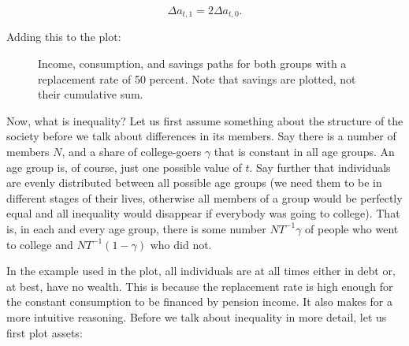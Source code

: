 \documentclass[a4paper, 12pt]{article}
\begin{document}
\[
    \Delta a_{t,1} = 2\Delta a_{t,0}.
\]

Adding this to the plot:

\begin{figure}[H]
    \centering
    \caption{Income, consumption, and savings paths for both groups with a replacement rate of 50 percent. Note that savings are plotted, not their cumulative sum.}
    \label{fig:graph3a_3}
\end{figure}

Now, what is inequality? Let us first assume something about the structure of the society before we talk about differences in its members. Say there is a number of members $N$, and a share of college-goers $\gamma$ that is constant in all age groups. An age group is, of course, just one possible value of $t$. Say further that individuals are evenly distributed between all possible age groups (we need them to be in different stages of their lives, otherwise all members of a group would be perfectly equal and all inequality would disappear if everybody was going to college). That is, in each and every age group, there is some number $NT^{-1}\gamma$ of people who went to college and $NT^{-1}(1-\gamma)$ who did not.

In the example used in the plot, all individuals are at all times either in debt or, at best, have no wealth. This is because the replacement rate is high enough for the constant consumption to be financed by pension income. It also makes for a more intuitive reasoning. Before we talk about inequality in more detail, let us first plot assets:
\end{document}
